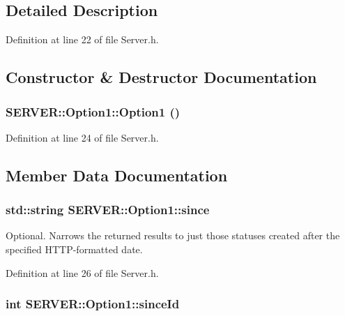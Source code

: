 \subsection{Detailed Description}


Definition at line 22 of file Server.h.

\subsection{Constructor \& Destructor Documentation}
\hypertarget{structSERVER_1_1Option1_f5c6a93cd6119cec081dab70fcb342d6}{
\subsubsection{\setlength{\rightskip}{0pt plus 5cm}SERVER::Option1::Option1 ()}}
\label{structSERVER_1_1Option1_f5c6a93cd6119cec081dab70fcb342d6}




Definition at line 24 of file Server.h.

\subsection{Member Data Documentation}
\hypertarget{structSERVER_1_1Option1_ab0f16c33d1a47822ab2622f1a8e03b4}{
\subsubsection{\setlength{\rightskip}{0pt plus 5cm}std::string {\bf SERVER::Option1::since}}}
\label{structSERVER_1_1Option1_ab0f16c33d1a47822ab2622f1a8e03b4}


Optional. Narrows the returned results to just those statuses created after the specified HTTP-formatted date. 



Definition at line 26 of file Server.h.\hypertarget{structSERVER_1_1Option1_30def1c303684fd431b3cb2d78fbe18d}{
\subsubsection{\setlength{\rightskip}{0pt plus 5cm}int {\bf SERVER::Option1::sinceId}}}
\label{structSERVER_1_1Option1_30def1c303684fd431b3cb2d78fbe18d}


